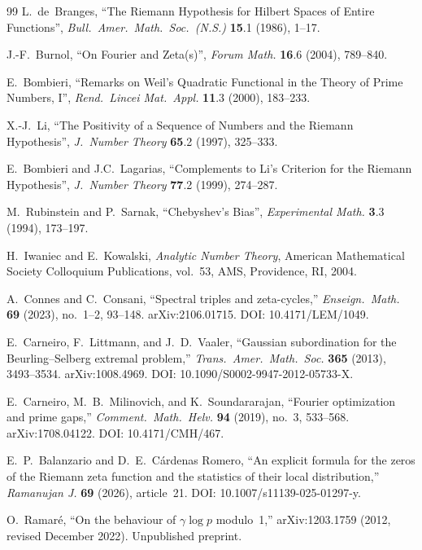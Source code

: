 \documentclass[11pt]{article}
\begin{document}
\begin{thebibliography}{99}
L.~de~Branges,
``The Riemann Hypothesis for Hilbert Spaces of Entire Functions'',
\emph{Bull.\ Amer.\ Math.\ Soc.\ (N.S.)} \textbf{15}.1 (1986),
1--17.

J.-F.~Burnol,
``On Fourier and Zeta(s)'',
\emph{Forum Math.} \textbf{16}.6 (2004), 789--840.

E.~Bombieri,
``Remarks on Weil's Quadratic Functional in the Theory of Prime
Numbers, I'',
\emph{Rend.\ Lincei Mat.\ Appl.} \textbf{11}.3 (2000), 183--233.

X.-J.~Li,
``The Positivity of a Sequence of Numbers and the Riemann
Hypothesis'',
\emph{J.\ Number Theory} \textbf{65}.2 (1997), 325--333.

E.~Bombieri and J.C.~Lagarias,
``Complements to Li's Criterion for the Riemann Hypothesis'',
\emph{J.\ Number Theory} \textbf{77}.2 (1999), 274--287.

M.~Rubinstein and P.~Sarnak,
``Chebyshev's Bias'',
\emph{Experimental Math.} \textbf{3}.3 (1994), 173--197.


H.~Iwaniec and E.~Kowalski,
\emph{Analytic Number Theory},
American Mathematical Society Colloquium Publications,
vol.~53, AMS, Providence, RI, 2004.

A.~Connes and C.~Consani,
``Spectral triples and zeta-cycles,''
\textit{Enseign.\ Math.} \textbf{69} (2023), no.~1--2, 93--148.
arXiv:2106.01715.
DOI: 10.4171/LEM/1049.

E.~Carneiro, F.~Littmann, and J.~D.~Vaaler,
``Gaussian subordination for the Beurling--Selberg extremal problem,''
\textit{Trans.\ Amer.\ Math.\ Soc.} \textbf{365} (2013),
3493--3534.
arXiv:1008.4969.
DOI: 10.1090/S0002-9947-2012-05733-X.

E.~Carneiro, M.~B.~Milinovich, and K.~Soundararajan,
``Fourier optimization and prime gaps,''
\textit{Comment.\ Math.\ Helv.} \textbf{94} (2019), no.~3, 533--568.
arXiv:1708.04122.
DOI: 10.4171/CMH/467.

E.~P.~Balanzario and D.~E.~C\'{a}rdenas Romero,
``An explicit formula for the zeros of the Riemann zeta function
and the statistics of their local distribution,''
\textit{Ramanujan J.} \textbf{69} (2026), article~21.
DOI: 10.1007/s11139-025-01297-y.

O.~Ramar\'{e},
``On the behaviour of $\gamma\log p$ modulo~1,''
arXiv:1203.1759 (2012, revised December 2022).
Unpublished preprint.


\end{thebibliography}
\end{document}

